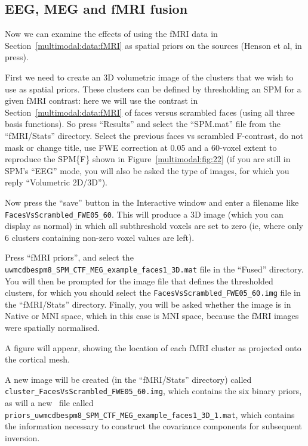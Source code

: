 \subsection{EEG, MEG and fMRI fusion \label{multimodal:fusion:fmri}}

Now we can examine the effects of using the fMRI data in Section~\ref{multimodal:data:fMRI} as spatial priors on the sources (Henson et al, in press).

First we need to create an 3D volumetric image of the clusters that we wish to use as spatial priors. These clusters can be defined by thresholding an SPM for a given fMRI contrast: here we will use the contrast in Section~\ref{multimodal:data:fMRI} of faces versus scrambled faces (using all three basis functions). So press ``Results'' and select the ``SPM.mat'' file from the ``fMRI/Stats'' directory. Select the previous faces vs scrambled F-contrast, do not mask or change title, use FWE correction at 0.05 and a 60-voxel extent to reproduce the SPM\{F\} shown in Figure~\ref{multimodal:fig:22} (if you are still in SPM's ``EEG'' mode, you will also be asked the type of images, for which you reply ``Volumetric 2D/3D'').

Now press the ``save'' button in the Interactive window and enter a filename like \texttt{Faces\-Vs\-Scrambled\_FWE05\_60}. This will produce a 3D image (which you can display as normal) in which all subthreshold voxels are set to zero (ie, where only 6 clusters containing non-zero voxel values are left).

Press ``fMRI priors'', and select the \texttt{uwmcdbespm8\_\-SPM\_\-CTF\_\-MEG\_\-example\_\-faces1\_\-3D.mat} file in the ``Fused'' directory. You will then be prompted for the image file that defines the thresholded clusters, for which you should select the \texttt{FacesVsScrambled\_\-FWE05\_\-60.img} file in the ``fMRI/Stats'' directory.
Finally, you will be asked whether the image is in Native or MNI space, which in this case is MNI space, because the fMRI images were spatially normalised.

A figure will appear, showing the location of each fMRI cluster as projected onto the cortical mesh.

A new image will be created (in the ``fMRI/Stats'' directory) called \texttt{cluster\_\-FacesVsScrambled\_\-FWE05\_\-60.img}, which contains the six binary priors, as will a new \matlab\ file called \texttt{priors\_\-uwmcdbespm8\_\-SPM\_\-CTF\_\-MEG\_\-example\_\-faces1\_\-3D\_\-1.mat}, which contains the information necessary to construct the covariance components for subsequent inversion.

